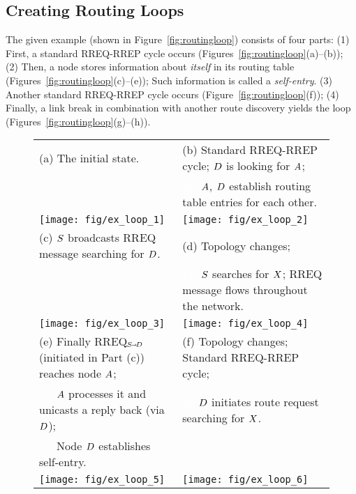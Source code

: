 \documentclass[letterpaper]{sig-alternate-pages}
\renewcommand{\msg}[3]{#1${}_{\!\!\;\MakeUppercase{#2}\!\!\:\shortrightarrow\!\MakeUppercase{#3}}$\xspace}
\newcommand{\gennode}[1]{\ensuremath{\MakeUppercase{#1}}\xspace}
\newcommand{\na}{\gennode{a}}
\newcommand{\nd}{\gennode{d}}
\newcommand{\ns}{\gennode{s}}
\newcommand{\nx}{\gennode{x}}
\begin{document}
\subsection{Creating Routing Loops}\label{ssec:self_to_loop}

The given example (shown in Figure~\ref{fig:routingloop}) consists of four parts:
(1) First, a standard RREQ-RREP cycle occurs (Figures~\ref{fig:routingloop}(a)--(b));
(2) Then, a node stores information about {\em itself} in its routing table (Figures~\ref{fig:routingloop}(c)--(e)); 
Such information is called a {\em self-entry}.
(3) Another standard RREQ-RREP cycle occurs (Figure~\ref{fig:routingloop}(f));
(4) Finally, a link break in combination with another route discovery yields the
loop (Figures~\ref{fig:routingloop}(g)--(h)).

\begin{figure*}
{\small
\newcommand{\myscale}{1.15}  \newcommand{\hi}{\hspace{15pt}}
\newcommand{\hii}{\hspace{27pt}}
\centering
\begin{tabular}{|@{~}p{86mm}@{~\,}|@{~}p{86mm}@{~}|}\hline
\rule{0mm}{3mm}
(a) The initial state.&(b) Standard RREQ-RREP cycle; \nd is looking for \na;\\
&\textcolor{white}{(b) }\na, \nd establish routing table entries for each other.\footnotemark\\[1ex]
\hii\texttt{[image: fig/ex\_loop\_1]}&
\hi\texttt{[image: fig/ex\_loop\_2]}\\
\hline
\rule{0mm}{3mm}
(c) \ns broadcasts RREQ message searching for \nd.&(d) Topology changes;\\
&\textcolor{white}{(d) }\ns searches for \nx; RREQ message flows throughout the network.\\[1ex]
\hi\texttt{[image: fig/ex\_loop\_3]}&
\hi\texttt{[image: fig/ex\_loop\_4]}\\
\hline
\rule{0mm}{3mm}
(e) Finally \msg{RREQ}{s}{d} (initiated in Part (c)) reaches node \na;&(f) Topology changes; Standard RREQ-RREP cycle;\\
\textcolor{white}{(e) }\na processes it and unicasts a reply back (via \nd);&\textcolor{white}{(f) }\nd initiates route request searching for \nx.\\
\textcolor{white}{(e) }Node \nd establishes self-entry.&\\
\hi\texttt{[image: fig/ex\_loop\_5]}&
\hi\texttt{[image: fig/ex\_loop\_6]}\\

\end{tabular}}
\end{figure*}
\end{document}
